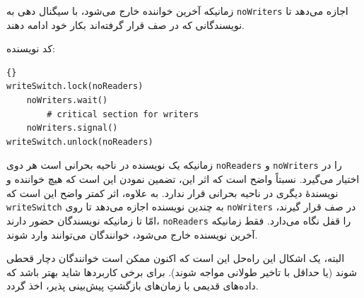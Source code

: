 \documentclass{book}
\newcommand{\clearemptydoublepage}{\newpage\cleardoublepage}
\begin{document}
    زمانیکه آخرین خواننده خارج می‌شود، با سیگنال دهی به {\tt noWriters} اجازه می‌دهد تا نویسندگانی که در صف قرار گرفته‌اند بکار خود ادامه دهند. 

    کد نویسنده: 

\begin{latin}
\begin{lstlisting}[title=\rl{راه حل نویسنده با اولویت نویسنده}]{}
writeSwitch.lock(noReaders)
    noWriters.wait()
        # critical section for writers
    noWriters.signal()
writeSwitch.unlock(noReaders)
\end{lstlisting}
\end{latin}

    زمانیکه یک نویسنده در ناحیه بحرانی است هر دوی {\tt noReaders} و {\tt noWriters} را در اختیار می‌گیرد. 
    نسبتاً واضح است که اثر این، تضمین نمودن این است که هیچ خواننده و نویسندهٔ دیگری در ناحیه بحرانی قرار ندارد. 
    به علاوه، اثر کمتر واضح این است که {\tt writeSwitch} به چندین نویسنده اجازه می‌دهد تا روی {\tt noWriters} در صف قرار گیرند،‌ 
    امّا تا زمانیکه نویسندگان حضور دارند،   {\tt noReaders} را قفل نگاه می‌دارد. 
    فقط زمانیکه آخرین نویسنده خارج می‌شود، خوانندگان می‌توانند وارد شوند. 

    البته، یک اشکال این راه‌حل این است که اکنون ممکن است خوانندگان دچار قحطی شوند (یا حداقل با تاخیر طولانی مواجه شوند).  
    برای برخی کاربردها شاید بهتر باشد که داده‌های قدیمی با زمان‌های بازگشتِ پیش‌بینی‌ پذیر، اخذ گردد. 


\clearemptydoublepage
\end{document}
